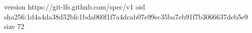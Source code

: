 version https://git-lfs.github.com/spec/v1
oid sha256:1d4a4da38d52bfc1bda060f1f7a4dcab07e99ec35ba7eb91f7b3066637deb5e9
size 72
